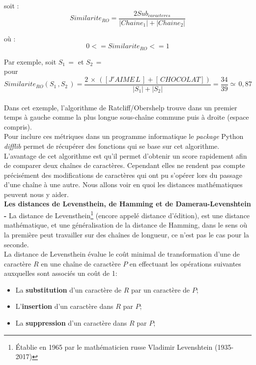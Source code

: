 soit : $$ Similarite_{RO} = \frac{2Sub_{caracteres}}{|Chaine_1|+|Chaine_2|} $$

où : $$ 0 <= Similarite_{RO} <= 1 $$

Par exemple, soit $ S_1 \,= $  et $ S_2 \,=$ \\

pour $$Similarite_{RO}(S_1 \,, S_2 \,) = \frac{2 \, \times \, ([J'AIME\, L\,] + [\, CHOCOLAT])}{|S_1|+|S_2|} = \frac{34}{39} \simeq  \, 0,87$$\\ 

Dans cet exemple, l'algorithme de Ratcliff/Obershelp trouve dans un premier temps  à gauche comme la plus longue sous-chaîne commune puis à droite  (espace compris).\\

Pour inclure ces métriques dans un programme informatique le \textit{package} Python \textit{difflib} permet de récupérer des fonctions qui se base sur cet algorithme.\\

L'avantage de cet algorithme est qu'il permet d'obtenir un score rapidement afin de comparer deux chaînes de caractères. Cependant elles ne rendent pas compte précisément des modifications de caractères qui ont pu s'opérer lors du passage d'une chaîne à une autre. Nous allons voir en quoi les distances mathématiques peuvent nous y aider.\\

\textbf{Les distances de Levensthein, de Hamming et de Damerau-Levenshtein -} La distance de Levensthein\footnote{Établie en 1965 par le mathématicien russe Vladimir Levenshtein (1935-2017)} (encore appelé distance d'édition), est une distance mathématique, et une généralisation de la distance de Hamming, dans le sens où la première peut travailler sur des chaînes de longueur, ce n'est pas le cas pour la seconde.\\

La distance de Levensthein évalue le coût minimal de transformation d'une de caractère $R$ en une chaîne de caractère $P$ en effectuant les opérations suivantes auxquelles sont associés un coût de 1:

\begin{itemize}
    \item La \textbf{substitution} d'un caractère de $R$ par un caractère de $P$;
    \item L'\textbf{insertion} d'un caractère dans $R$ par $P$;
    \item La \textbf{suppression} d'un caractère dans $R$ par $P$;
\end{itemize}

